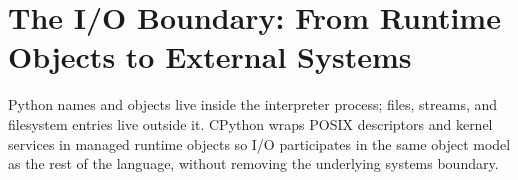 \section{The I/O Boundary: From Runtime Objects to External Systems}

Python names and objects live inside the interpreter process; files, streams, and filesystem entries live outside it. CPython wraps POSIX descriptors and kernel services in managed runtime objects so I/O participates in the same object model as the rest of the language, without removing the underlying systems boundary.
